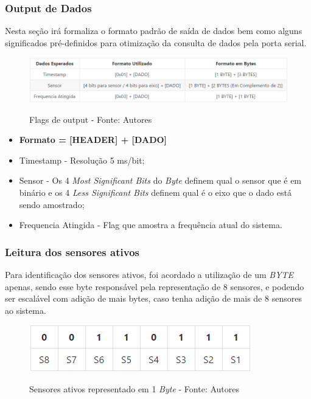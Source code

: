 \subsubsection*{Output de Dados}

Nesta seção irá formaliza o formato padrão de saída de dados bem como alguns significados pré-definidos para otimização da consulta de dados pela porta serial.

\begin{figure}[H]
\centering
\includegraphics[keepaspectratio=true,scale=0.75]{figuras/flags_output.png}
\label{fig:flags_input}
\caption{Flags de output - Fonte: Autores}
\end{figure}

\begin{itemize}
  \item \textbf{Formato = [HEADER] + [DADO]}
  \item Timestamp - Resolução 5 ms/bit;
  \item Sensor - Os 4 \textit{Most Significant Bits} do \textit{Byte} definem qual o sensor que é em binário e os 4 \textit{Less Significant Bits} definem qual é o eixo que o dado está sendo amostrado;
  \item Frequencia Atingida - Flag que amostra a frequência atual do sistema.
\end{itemize}

\subsubsection*{Leitura dos sensores ativos}

Para identificação dos sensores ativos, foi acordado a utilização de um \textit{BYTE} apenas, sendo esse byte responsável pela representação de 8 sensores, e podendo ser escalável com adição de mais bytes, caso tenha adição de mais de 8 sensores ao sistema.

\begin{figure}[H]
\centering
\includegraphics[keepaspectratio=true,scale=0.9]{figuras/active_sensors.png}
\label{fig:active_sensors}
\caption{Sensores ativos representado em 1 \textit{Byte} - Fonte: Autores}
\end{figure}

